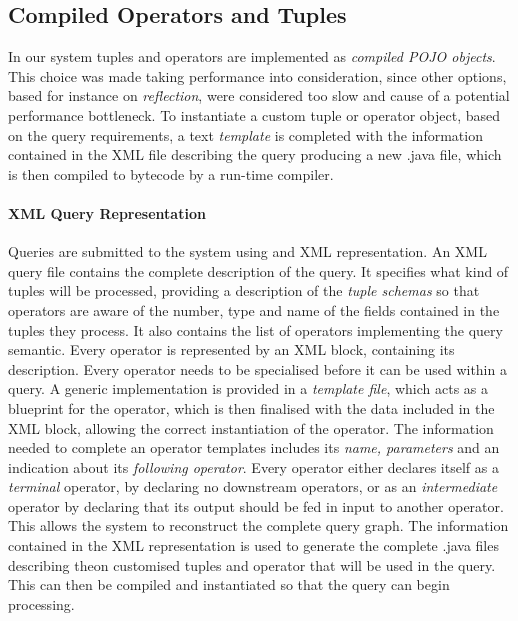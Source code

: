 \subsection*{Compiled Operators and Tuples}
\label{sec:templates}
In our system tuples and operators are implemented as \emph{compiled POJO objects}. This choice was made
taking performance into consideration, since other options, based for instance on \emph{reflection}, were considered too
slow and cause of a potential performance bottleneck. To instantiate a custom tuple or operator object,
based on the query requirements, a text \textit{template} is completed with the information contained in the XML file
describing the query producing a new .java file, which is then compiled to bytecode by a run-time compiler. 

\paragraph{XML Query Representation} Queries are submitted to the system using and XML representation. An
XML query file contains the complete description of the query. It specifies what kind of tuples will be
processed, providing a description of the \emph{tuple schemas} so that operators are aware of the
number, type and name of the fields contained in the tuples they process. It also contains the list of operators
implementing the query semantic. Every operator is represented by an XML block, containing its
description. Every operator needs to be specialised before it can be used within a query. A generic
implementation is provided in a \emph{template file}, which acts as a blueprint for the operator, which
is then finalised with the data included in the XML block, allowing the correct instantiation of the
operator.
The information needed to complete an operator templates includes its \emph{name, parameters} and an indication about its \emph{following operator}. Every operator either declares itself as a
\emph{terminal} operator, by declaring no downstream operators, or as an \emph{intermediate} operator by
declaring that its output should be fed in input to another operator. This allows the system to
reconstruct the complete query graph. 
The information contained in the XML representation is used to generate the complete .java files
describing theon customised tuples and operator that will be used in the query. This can then be compiled
and instantiated so that the query can begin processing. 

